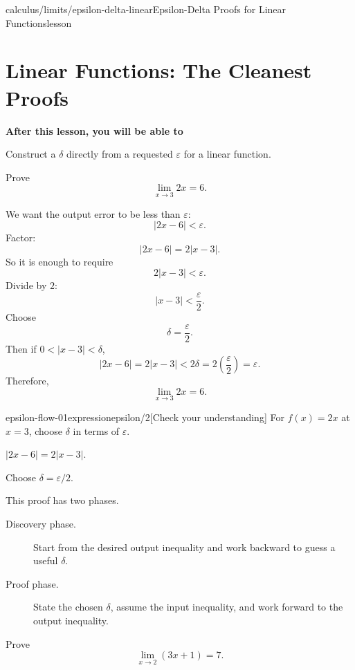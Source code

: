 \documentclass[11pt,openany]{book}
\theoremstyle{bgplain}
\newcounter{bgexample}[chapter]
\newcounter{bgcheck}[section]
\newcommand{\lessonobjective}[1]{%
  \par\Needspace{4\baselineskip}\addvspace{0.6em}%
  {\bfseries\color{BGInk}After this lesson, you will be able to}\par\smallskip
  #1\par\addvspace{0.5em}%
}
\newcommand{\eps}{\varepsilon}
\begin{document}
\begin{webpage}{calculus/limits/epsilon-delta-linear}{Epsilon-Delta Proofs for Linear Functions}{lesson}
\section{Linear Functions: The Cleanest Proofs}

\lessonobjective{
Construct a \(\delta\) directly from a requested \(\eps\) for a linear function.
}

\begin{bgguided}[title={\(f(x)=2x\)}]
Prove
\[
  \lim_{x\to3}2x=6.
\]

\begin{bgsolution}
We want the output error to be less than \(\eps\):
\[
  |2x-6|<\eps.
\]
Factor:
\[
  |2x-6|=2|x-3|.
\]
So it is enough to require
\[
  2|x-3|<\eps.
\]
Divide by \(2\):
\[
  |x-3|<\frac\eps2.
\]
Choose
\[
  \boxed{\delta=\frac\eps2}.
\]
Then if \(0<|x-3|<\delta\),
\[
  |2x-6|=2|x-3|<2\delta=2\left(\frac\eps2\right)=\eps.
\]
Therefore,
\[
  \lim_{x\to3}2x=6.
\]
\end{bgsolution}
\end{bgguided}


\begin{bgcheck}{epsilon-flow-01}{expression}{epsilon/2}[Check your understanding]
For \(f(x)=2x\) at \(x=3\), choose \(\delta\) in terms of \(\varepsilon\).
\begin{bghint}
\(|2x-6|=2|x-3|\).
\end{bghint}
\begin{bgreveal}
Choose \(\delta=\varepsilon/2\).
\end{bgreveal}
\end{bgcheck}



This proof has two phases.

\begin{description}
  \item[Discovery phase.] Start from the desired output inequality and work backward to guess a useful \(\delta\).
  \item[Proof phase.] State the chosen \(\delta\), assume the input inequality, and work forward to the output inequality.
\end{description}

\begin{bgexample}[title={A general linear function}]
Prove
\[
  \lim_{x\to2}(3x+1)=7.
\]


\end{bgexample}
\end{webpage}
\end{document}
